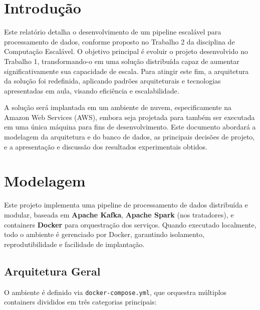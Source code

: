 \documentclass[a4paper,12pt]{article}
\begin{document}
\tableofcontents
\newpage


\section{Introdução}

Este relatório detalha o desenvolvimento de um pipeline escalável para processamento de dados,
conforme proposto no Trabalho 2 da disciplina de Computação Escalável. O objetivo principal é 
evoluir o projeto desenvolvido no Trabalho 1, transformando-o em uma solução distribuída 
capaz de aumentar significativamente sua capacidade de escala. Para atingir este fim, a arquitetura 
da solução foi redefinida, aplicando padrões arquiteturais e tecnologias apresentadas em aula, visando eficiência e escalabilidade.

A solução será implantada em um ambiente de nuvem, especificamente na Amazon Web Services (AWS),
embora seja projetada para também ser executada em uma única máquina para fins de desenvolvimento. 
Este documento abordará a modelagem da arquitetura e do banco de dados, as principais
decisões de projeto, e a apresentação e discussão dos resultados experimentais obtidos.

\section{Modelagem}

Este projeto implementa uma pipeline de processamento de dados distribuída e modular, baseada em \textbf{Apache Kafka}, \textbf{Apache Spark} (nos tratadores), e containers \textbf{Docker} para orquestração dos serviços. Quando executado localmente, todo o ambiente é gerenciado por Docker, garantindo isolamento, reprodutibilidade e facilidade de implantação.

\subsection{Arquitetura Geral}

O ambiente é definido via \texttt{docker-compose.yml}, que orquestra múltiplos containers divididos em três categorias principais:
\end{document}
